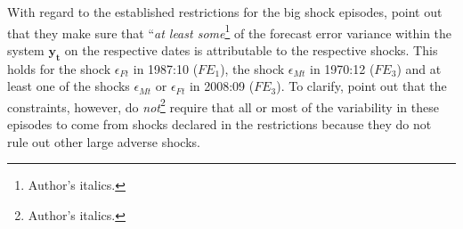 \documentclass[a4paper,11pt,listof=nochaptergap,oneside,pointednumbers,bibtotoc,bigheadings,liststotoc,hidelinks]{scrbook}
\theoremstyle{mysatz}
\theoremstyle{mydefinition}
\theoremstyle{mytheorem}
\theoremstyle{mybemerkung}
\newcommand{\vect}[1]{\boldsymbol{\mathbf{#1}}}
\begin{document}
With regard to the established restrictions for the big shock episodes, \citet[p. 12]{ludvigsonetal:19} point out that they make sure that ``\textit{at least some}\footnote{Author's italics.} of the forecast error variance within the system $\vect{y_t}$ on the respective dates is attributable to the respective shocks. This holds for the shock $\epsilon_{Ft}$ in 1987:10 ($FE_1$), the shock $\epsilon_{Mt}$ in 1970:12 ($FE_3$) and at least one of the shocks $\epsilon_{Mt}$ or $\epsilon_{Ft}$ in 2008:09 ($FE_3$). To clarify, \citet{ludvigsonetal:19} point out that the constraints, however, do \textit{not}\footnote{Author's italics.} require that all or most of the variability in these episodes to come from shocks declared in the restrictions because they do not rule out other large adverse shocks.
\\
\end{document}
